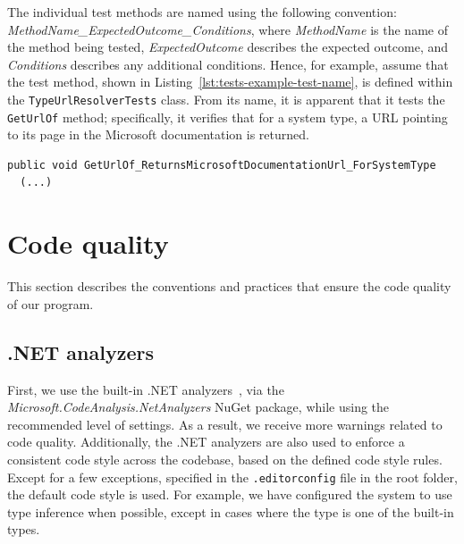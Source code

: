 The individual test methods are named using the following convention: \textit{MethodName\_ExpectedOutcome\_Conditions}, where \textit{MethodName} is the name of the method being tested, \textit{ExpectedOutcome} describes the expected outcome, and \textit{Conditions} describes any additional conditions.
Hence, for example, assume that the test method, shown in Listing~\ref{lst:tests-example-test-name}, is defined within the \texttt{TypeUrlResolverTests} class.
From its name, it is apparent that it tests the \texttt{GetUrlOf} method; specifically, it verifies that for a system type, a URL pointing to its page in the Microsoft documentation is returned.

\begin{listing}[H]
\begin{lstlisting}
public void GetUrlOf_ReturnsMicrosoftDocumentationUrl_ForSystemType
  (...)
\end{lstlisting}
\caption{Example unit test method}
\label{lst:tests-example-test-name}
\end{listing}

\section{Code quality}

This section describes the conventions and practices that ensure the code quality of our program.

\subsection*{.NET analyzers}

First, we use the built-in .NET analyzers~\cite{net_analyzers}, via the \textit{Microsoft.CodeAnalysis.NetAnalyzers} NuGet package, while using the recommended level of settings.
As a result, we receive more warnings related to code quality.
Additionally, the .NET analyzers are also used to enforce a consistent code style across the codebase, based on the defined code style rules.
Except for a few exceptions, specified in the \texttt{.editorconfig} file in the root folder, the default code style is used.
For example, we have configured the system to use type inference when possible, except in cases where the type is one of the built-in types.
 
